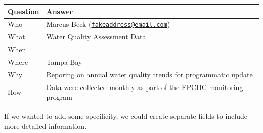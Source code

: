 \documentclass[
]{book}
\newcounter{none} %
\begin{document}
{\def\LTcaptype{none} %
\begin{longtable}[]{@{}
  >{\centering\arraybackslash}p{}
  >{\centering\arraybackslash}p{}@{}}
\toprule\noalign{}
\begin{minipage}[b]{\linewidth}\centering
Question
\end{minipage} & \begin{minipage}[b]{\linewidth}\centering
Answer
\end{minipage} \\
\midrule\noalign{}
\endhead
\bottomrule\noalign{}
\endlastfoot
Who & Marcus Beck
(\href{mailto:fakeaddress@email.com}{\nolinkurl{fakeaddress@email.com}}) \\
What & Water Quality Assessment Data \\
When & 2020 \\
Where & Tampa Bay \\
Why & Reporing on annual water
quality trends for
programmatic update \\
How & Data were collected monthly as
part of the EPCHC monitoring
program \\
\end{longtable}
}

If we wanted to add some specificity, we could create separate fields to include more detailed information.
\end{document}
